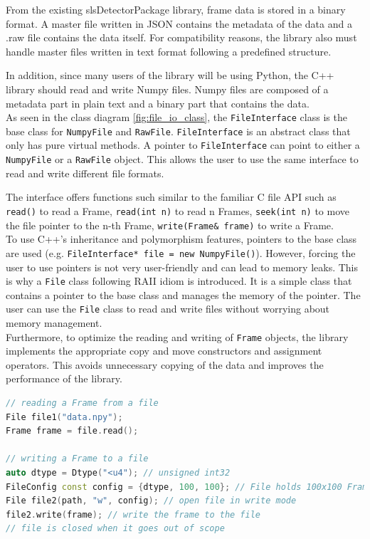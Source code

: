 \documentclass[./chapitre3.tex]{subfiles}
\begin{document}
From the existing slsDetectorPackage library, frame data is stored in a binary format.
A master file written in JSON contains the metadata of the data and a .raw file contains the data itself.
For compatibility reasons, the library also must handle master files written in text
format following a predefined structure.

In addition, since many users of the library will be using Python, the C++ library should
read and write Numpy files. Numpy files are composed of a metadata part in plain text and
a binary part that contains the data.\\

As seen in the class diagram \ref{fig:file_io_class}, the \lstinline|FileInterface| class
is the base class for \lstinline|NumpyFile| and \lstinline|RawFile|. \lstinline|FileInterface|
is an abstract class that only has pure virtual methods. A pointer to \lstinline|FileInterface|
can point to either a \lstinline|NumpyFile| or a \lstinline|RawFile| object. This allows the
user to use the same interface to read and write different file formats.

The interface offers functions such similar to the familiar C file API such as \lstinline|read()|
to read a Frame, \lstinline|read(int n)| to read n Frames, \lstinline|seek(int n)| to move the
file pointer to the n-th Frame, \lstinline|write(Frame& frame)| to write a Frame.\\

To use C++'s inheritance and polymorphism features, pointers to the base class are used
(e.g. \lstinline|FileInterface* file = new NumpyFile()|). However, forcing the user to use
pointers is not very user-friendly and can lead to memory leaks. This is why a \lstinline|File|
class following RAII idiom is introduced. It is a simple class that contains a pointer to
the base class and manages the memory of the pointer. The user can use the \lstinline|File|
class to read and write files without worrying about memory management.\\

Furthermore, to optimize the reading and writing of \lstinline|Frame| objects, the
library implements the appropriate copy and move constructors and assignment operators.
This avoids unnecessary copying of the data and improves the performance of the library.\\

\begin{lstlisting}[language=C++, caption={Example: Reading and writing a Frame from a file},label={lst:read_frame}]
// reading a Frame from a file
File file1("data.npy");
Frame frame = file.read();

// writing a Frame to a file
auto dtype = Dtype("<u4"); // unsigned int32
FileConfig const config = {dtype, 100, 100}; // File holds 100x100 Frames of uint32_t
File file2(path, "w", config); // open file in write mode
file2.write(frame); // write the frame to the file
// file is closed when it goes out of scope
\end{lstlisting}
\end{document}
